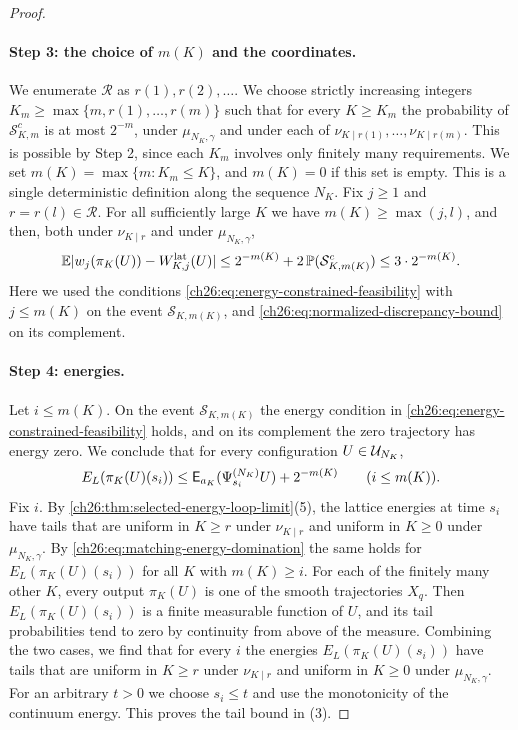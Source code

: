 \begin{proof}
\paragraph{Step 3: the choice of $m(K)$ and the coordinates.}
We enumerate $\mathcal R$ as $r(1),r(2),\dots$. We choose strictly increasing integers $K_m\ge\max\{m,r(1),\dots,r(m)\}$ such that for every $K\ge K_m$ the probability of $\mathcal S_{K,m}^c$ is at most $2^{-m}$, under $\mu_{N_K,\gamma}$ and under each of $\nu_{K\mid r(1)},\dots,\nu_{K\mid r(m)}$. This is possible by Step 2, since each $K_m$ involves only finitely many requirements. We set $m(K)=\max\{m:K_m\le K\}$, and $m(K)=0$ if this set is empty. This is a single deterministic definition along the sequence $N_K$. Fix $j\ge1$ and $r=r(l)\in\mathcal R$. For all sufficiently large $K$ we have $m(K)\ge\max(j,l)$, and then, both under $\nu_{K\mid r}$ and under $\mu_{N_K,\gamma}$,
\begin{equation}\label{ch26:eq:matching-coordinate-error}
 \mathbb E\lvert w_j(\pi_K(U))-W^{\mathrm{lat}}_{K,j}(U)\rvert\le2^{-m(K)}+2\,\mathbb P(\mathcal S_{K,m(K)}^c)\le3\cdot2^{-m(K)} .
\end{equation}
Here we used the conditions \eqref{ch26:eq:energy-constrained-feasibility} with $j\le m(K)$ on the event $\mathcal S_{K,m(K)}$, and \eqref{ch26:eq:normalized-discrepancy-bound} on its complement.

\paragraph{Step 4: energies.}
Let $i\le m(K)$. On the event $\mathcal S_{K,m(K)}$ the energy condition in \eqref{ch26:eq:energy-constrained-feasibility} holds, and on its complement the zero trajectory has energy zero. We conclude that for every configuration $U\in\mathcal U_{N_K}$,
\begin{equation}\label{ch26:eq:matching-energy-domination}
 E_L(\pi_K(U)(s_i))\le\mathsf E_{a_K}(\Psi^{(N_K)}_{s_i}U)+2^{-m(K)}\qquad(i\le m(K)).
\end{equation}
Fix $i$. By \cref{ch26:thm:selected-energy-loop-limit}(5), the lattice energies at time $s_i$ have tails that are uniform in $K\ge r$ under $\nu_{K\mid r}$ and uniform in $K\ge0$ under $\mu_{N_K,\gamma}$. By \eqref{ch26:eq:matching-energy-domination} the same holds for $E_L(\pi_K(U)(s_i))$ for all $K$ with $m(K)\ge i$. For each of the finitely many other $K$, every output $\pi_K(U)$ is one of the smooth trajectories $X_q$. Then $E_L(\pi_K(U)(s_i))$ is a finite measurable function of $U$, and its tail probabilities tend to zero by continuity from above of the measure. Combining the two cases, we find that for every $i$ the energies $E_L(\pi_K(U)(s_i))$ have tails that are uniform in $K\ge r$ under $\nu_{K\mid r}$ and uniform in $K\ge0$ under $\mu_{N_K,\gamma}$. For an arbitrary $t>0$ we choose $s_i\le t$ and use the monotonicity of the continuum energy. This proves the tail bound in (3).


\end{proof}
